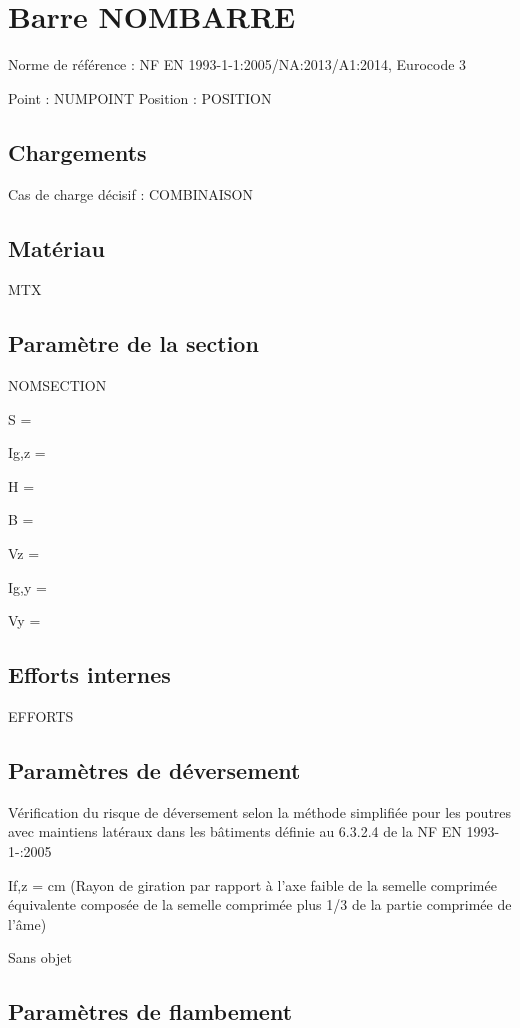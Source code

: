 \section{Barre NOMBARRE}

Norme de référence : NF EN 1993-1-1:2005/NA:2013/A1:2014, Eurocode 3

Point : NUMPOINT
Position : POSITION

\subsection{Chargements}

Cas de charge décisif : COMBINAISON

\subsection{Matériau}

MTX

\subsection{Paramètre de la section}

NOMSECTION

S =

I{g,z} =

H =

B =

V{z} =

I{g,y} =

V{y} =

\subsection{Efforts internes}

EFFORTS

\subsection{Paramètres de déversement}

Vérification du risque de déversement selon la méthode simplifiée pour les poutres avec maintiens latéraux dans les bâtiments définie au 6.3.2.4 de la NF EN 1993-1-:2005

I{f,z} = cm (Rayon de giration par rapport à l'axe faible de la semelle comprimée équivalente composée de la semelle comprimée plus 1/3 de la partie comprimée de l'âme)

Sans objet

\subsection{Paramètres de flambement}

